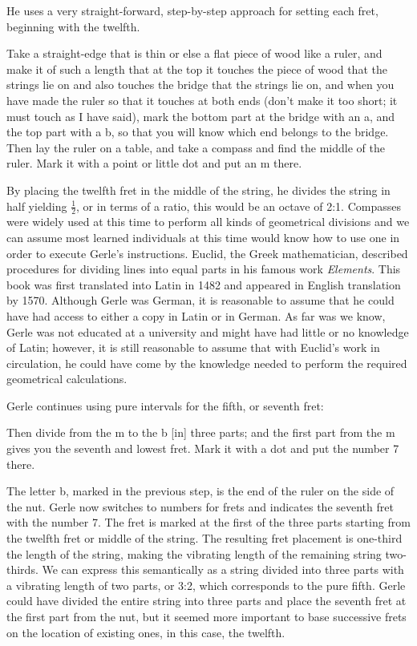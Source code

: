 He uses a very straight-forward, step-by-step approach for setting each fret, beginning
with the twelfth.
\begin{blocks}
Take a straight-edge that is thin or else a flat piece of wood like a ruler, and make it
of such a length that at the top it touches the piece of wood that the strings lie on and
also touches the bridge that the strings lie on, and when you have made the ruler so that
it touches at both ends (don't make it too short; it must touch as I have said), mark the
bottom part at the bridge with an a, and the top part with a b, so that you will know
which end belongs to the bridge.  Then lay the ruler on a table, and take a compass and
find the middle of the ruler.  Mark it with a point or little dot and put an m there.
\end{blocks}
By placing the twelfth fret in the middle of the string, he divides the string in half
yielding $ \frac{1}{2} $, or in terms of a ratio, this would be an octave of 2:1.
Compasses were widely used at this time to perform all kinds of geometrical divisions and
we can assume most learned individuals at this time would know how to use one in order to
execute Gerle's instructions.  Euclid, the Greek mathematician, described procedures for
dividing lines into equal parts in his famous work \textit{Elements}.  This book was
first translated into Latin in 1482 and appeared in English translation by 1570.  Although
Gerle was German, it is reasonable to assume that he could have had access to either a
copy in Latin or in German.  As far was we know, Gerle was not educated at a university
and might have had little or no knowledge of Latin; however, it is still reasonable to
assume that with Euclid's work in circulation, he could have come by the knowledge needed
to perform the required geometrical calculations.

Gerle continues using pure intervals for the fifth, or seventh fret:
\begin{blocks}
Then divide from the m to the b [in] three parts; and the first part from the m gives you
the seventh and lowest fret.  Mark it with a dot and put the number 7 there.
\end{blocks}
The letter b, marked in the previous step, is the end of the ruler on the side of the nut.
Gerle now switches to numbers for frets and indicates the seventh fret with the number 7.
The fret is marked at the first of the three parts starting from the twelfth fret or
middle of the string.  The resulting fret placement is one-third the length of the string,
making the vibrating length of the remaining string two-thirds. We can express this
semantically as a string divided into three parts with a vibrating length of two parts, or
3:2, which corresponds to the pure fifth.  Gerle could have divided the entire string into
three parts and place the seventh fret at the first part from the nut, but it seemed more
important to base successive frets on the location of existing ones, in this case, the
twelfth.


